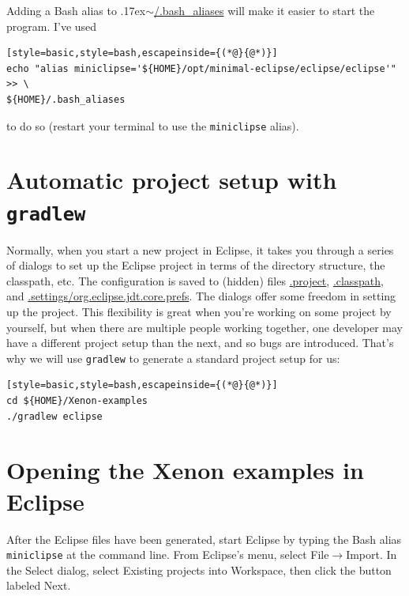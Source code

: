 \documentclass[12pt, a4paper, twoside, openany, titlepage]{book}
\newcommand{\mytilde}{\raise.17ex\hbox{$\scriptstyle\sim$}}
\begin{document}

Adding a Bash alias to \mytilde\url{/.bash_aliases} will make it easier to start the program. I've used
\begin{lstlisting}[style=basic,style=bash,escapeinside={(*@}{@*)}]
echo "alias miniclipse='${HOME}/opt/minimal-eclipse/eclipse/eclipse'" >> \
${HOME}/.bash_aliases
\end{lstlisting}
to do so (restart your terminal to use the \texttt{miniclipse} alias).

\section{Automatic project setup with \texttt{gradlew}}


Normally, when you start a new project in Eclipse, it takes you through a series of dialogs to set up the Eclipse project in terms of the directory structure, the classpath, etc. The configuration is saved to (hidden) files \url{.project}, \url{.classpath}, and \url{.settings/org.eclipse.jdt.core.prefs}. The dialogs offer some freedom in setting up the project. This flexibility is great when you're working on some project by yourself, but when there are multiple people working together, one developer may have a different project setup than the next, and so bugs are introduced. That's why we will use \texttt{gradlew} to generate a standard project setup for us:

\begin{lstlisting}[style=basic,style=bash,escapeinside={(*@}{@*)}]
cd ${HOME}/Xenon-examples
./gradlew eclipse
\end{lstlisting} %

\section{Opening the Xenon examples in Eclipse}

After the Eclipse files have been generated, start Eclipse by typing the Bash alias \texttt{miniclipse} at the command line. From Eclipse's menu, select \textsf{File}$\rightarrow$\textsf{Import}. In the \textsf{Select} dialog, select \textsf{Existing projects into Workspace}, then click the button labeled \textsf{Next}.
\end{document}
